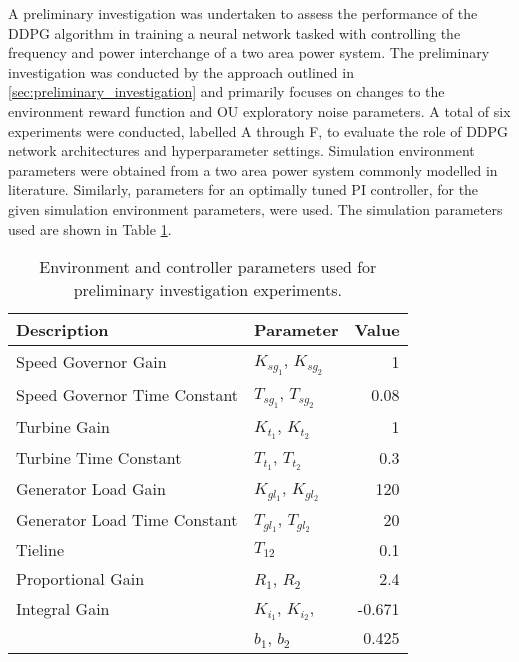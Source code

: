 A preliminary investigation was undertaken to assess the performance of the DDPG algorithm in training a neural network tasked with controlling the frequency and power interchange of a two area power system. The preliminary investigation was conducted by the approach outlined in \textsection \ref{sec:preliminary_investigation} and primarily focuses on changes to the environment reward function and OU exploratory noise parameters. A total of six experiments were conducted, labelled A through F, to evaluate the role of DDPG network architectures and hyperparameter settings. Simulation environment parameters were obtained from a two area power system commonly modelled in literature. Similarly, parameters for an optimally tuned PI controller, for the given simulation environment parameters, were used. The simulation parameters used are shown in Table \ref{tab:5000}.
\begin{table}[h]
	\centering
	\caption{Environment and controller parameters used for preliminary investigation experiments.}
	\begin{tabular}{llr}
		\toprule
		\textbf{Description} & \textbf{Parameter} & \textbf{Value} \\
		\midrule
		Speed Governor Gain & $K_{sg_1}$, $K_{sg_2}$ & 1 \\
		Speed Governor Time Constant & $T_{sg_1}$, $T_{sg_2}$ & 0.08 \\
		Turbine Gain & $K_{t_1}$, $K_{t_2}$ & 1 \\
		Turbine Time Constant & $T_{t_1}$, $T_{t_2}$ & 0.3 \\
		Generator Load Gain & $K_{gl_1}$, $K_{gl_2}$ & 120 \\
		Generator Load Time Constant & $T_{gl_1}$, $T_{gl_2}$ & 20 \\
		Tieline & $T_{12}$ & 0.1 \\
		Proportional Gain & $R_1$, $R_2$ & 2.4 \\
		Integral Gain & $K_{i_1}$, $K_{i_2}$, & -0.671 \\
		 & $b_1$, $b_2$ & 0.425 \\
		\bottomrule
	\end{tabular}\label{tab:5000}
\end{table}


